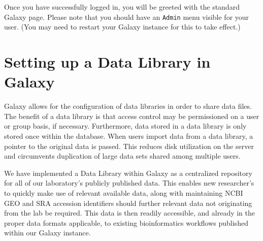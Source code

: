 \documentclass[a4paper,10pt]{article}
\begin{document}
Once you have successfully logged in, you will be greeted with the standard Galaxy page.  Please note that you should have an \texttt{\footnotesize{Admin}} menu visible for your user.  (You may need to restart your Galaxy instance for this to take effect.)\vspace{1em}\\
\setlength\fboxsep{0pt}\vspace{1em}

\section{Setting up a Data Library in Galaxy}
Galaxy allows for the configuration of data libraries in order to share data files.  The benefit of a data library is that access control may be permissioned on a user or group basis, if necessary.  Furthermore, data stored in a data library is only stored once within the database.  When users import data from a data library, a pointer to the original data is passed.  This reduces disk utilization on the server and circumvents duplication of large data sets shared among multiple users.

We have implemented a Data Library within Galaxy as a centralized repository for all of our laboratory's publicly published data.  This enables new researcher's to quickly make use of relevant available data, along with maintaining NCBI GEO and SRA accession identifiers should further relevant data not originating from the lab be required.  This data is then readily accessible, and already in the proper data formats applicable, to existing bioinformatics workflows published within our Galaxy instance.
\end{document}
